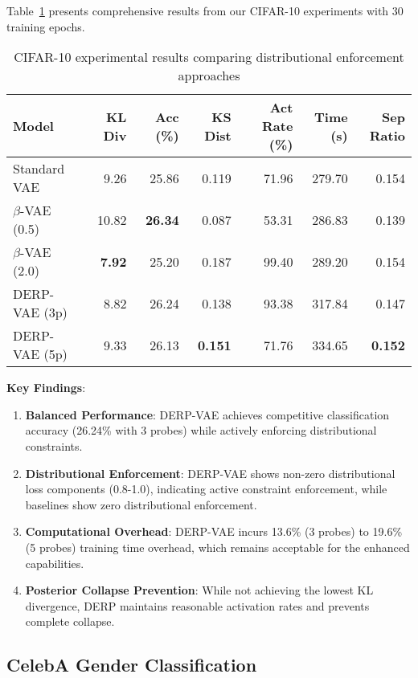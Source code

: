 \documentclass{article}
\begin{document}
Table~\ref{tab:cifar_results} presents comprehensive results from our CIFAR-10 experiments with 30 training epochs.

\begin{table}[h]
\caption{CIFAR-10 experimental results comparing distributional enforcement approaches}
\label{tab:cifar_results}
\centering
\begin{tabular}{lrrrrrr}
\toprule
Model & KL Div & Acc (\%) & KS Dist & Act Rate (\%) & Time (s) & Sep Ratio \\
\midrule
Standard VAE & 9.26 & 25.86 & 0.119 & 71.96 & 279.70 & 0.154 \\
$\beta$-VAE (0.5) & 10.82 & \textbf{26.34} & 0.087 & 53.31 & 286.83 & 0.139 \\
$\beta$-VAE (2.0) & \textbf{7.92} & 25.20 & 0.187 & 99.40 & 289.20 & 0.154 \\
DERP-VAE (3p) & 8.82 & 26.24 & 0.138 & 93.38 & 317.84 & 0.147 \\
DERP-VAE (5p) & 9.33 & 26.13 & \textbf{0.151} & 71.76 & 334.65 & \textbf{0.152} \\
\bottomrule
\end{tabular}
\end{table}

\textbf{Key Findings}:

\begin{enumerate}
    \item \textbf{Balanced Performance}: DERP-VAE achieves competitive classification accuracy (26.24\% with 3 probes) while actively enforcing distributional constraints.
    
    \item \textbf{Distributional Enforcement}: DERP-VAE shows non-zero distributional loss components (0.8-1.0), indicating active constraint enforcement, while baselines show zero distributional enforcement.
    
    \item \textbf{Computational Overhead}: DERP-VAE incurs 13.6\% (3 probes) to 19.6\% (5 probes) training time overhead, which remains acceptable for the enhanced capabilities.
    
    \item \textbf{Posterior Collapse Prevention}: While not achieving the lowest KL divergence, DERP maintains reasonable activation rates and prevents complete collapse.
\end{enumerate}

\subsection{CelebA Gender Classification}
\end{document}

